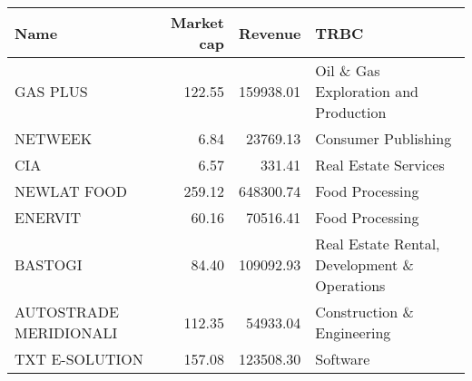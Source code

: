 \begin{tabular}{lrrl}
\toprule
                  Name &  Market cap &   Revenue &                                         TRBC \\
\midrule
              GAS PLUS &      122.55 & 159938.01 &         Oil \& Gas Exploration and Production \\
               NETWEEK &        6.84 &  23769.13 &                          Consumer Publishing \\
                   CIA &        6.57 &    331.41 &                         Real Estate Services \\
           NEWLAT FOOD &      259.12 & 648300.74 &                              Food Processing \\
               ENERVIT &       60.16 &  70516.41 &                              Food Processing \\
               BASTOGI &       84.40 & 109092.93 & Real Estate Rental, Development \& Operations \\
AUTOSTRADE MERIDIONALI &      112.35 &  54933.04 &                   Construction \& Engineering \\
        TXT E-SOLUTION &      157.08 & 123508.30 &                                     Software \\
\bottomrule
\end{tabular}

